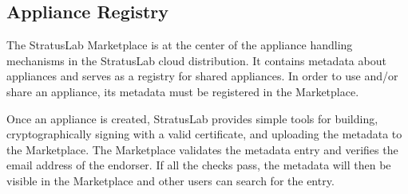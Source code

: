 \subsection{Appliance Registry}

The StratusLab Marketplace is at the center of the appliance handling
mechanisms in the StratusLab cloud distribution. It contains metadata 
about appliances and serves as a registry for shared appliances. 
In order to use and/or share an appliance, its metadata must be registered 
in the Marketplace\@. 

Once an appliance is created, StratusLab provides simple tools for 
building, cryptographically signing with a valid
certificate, and uploading the metadata to the Marketplace\@.  The Marketplace
validates the metadata entry and verifies the 
email address of the endorser.  If all the checks pass, 
the metadata will then be visible in the Marketplace and other users 
can search for the entry.
